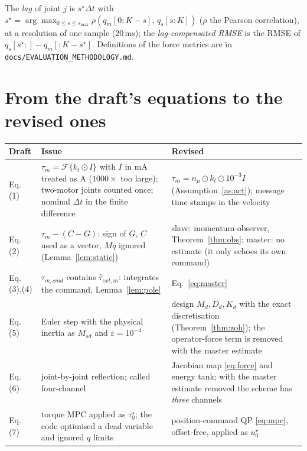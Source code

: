 \documentclass[11pt,a4paper]{article}
\theoremstyle{remark}
\theoremstyle{definition}
\begin{document}
The \emph{lag} of joint $j$ is $s^\star\Delta t$ with $s^\star=\arg\max_{0\le s\le s_{\max}}\rho(q_m[0{:}K{-}s],\,q_s[s{:}K])$ ($\rho$ the Pearson correlation), at a resolution of one sample (20\,ms); the \emph{lag-compensated RMSE} is the RMSE of $q_s[s^\star{:}]-q_m[{:}K{-}s^\star]$.
Definitions of the force metrics are in \texttt{docs/EVALUATION\_METHODOLOGY.md}.

\section{From the draft's equations to the revised ones}\label{sec:map-eq}
\begin{center}\small
\begin{tabular}{@{}p{1.6cm}p{5.2cm}p{7.2cm}@{}}
\toprule
Draft & Issue & Revised\\
\midrule
Eq.\,(1) & $\tau_m=\mathcal F\{k_t\odot I\}$ with $I$ in mA treated as A ($1000\times$ too large); two-motor joints counted once; nominal $\Delta t$ in the finite difference & $\tau_m=n_\mu\odot k_t\odot10^{-3}I$ (Assumption~\ref{as:act}); message time stamps in the velocity\\
Eq.\,(2) & $\tau_m-(C-G)$: sign of $G$, $C$ used as a vector, $M\ddot q$ ignored (Lemma~\ref{lem:static}) & slave: momentum observer, Theorem~\ref{thm:obs}; master: no estimate (it only echoes its own command)\\
Eq.\,(3),(4) & $\tau_{m,cmd}$ contains $\hat\tau_{ext,m}$: integrates the command, Lemma~\ref{lem:pole} & Eq.~\eqref{eq:master}\\
Eq.\,(5) & Euler step with the physical inertia as $M_{sd}$ and $\varepsilon=10^{-4}$ & design $M_d,D_d,K_d$ with the exact discretisation (Theorem~\ref{thm:zoh}); the operator-force term is removed with the master estimate\\
Eq.\,(6) & joint-by-joint reflection; called four-channel & Jacobian map \eqref{eq:force} and energy tank; with the master estimate removed the scheme has \emph{three} channels\\
Eq.\,(7) & torque MPC applied as $\tau_0^\star$; the code optimised a dead variable and ignored $q$ limits & position-command QP \eqref{eq:mpc}, offset-free, applied as $u_0^\star$\\
\bottomrule
\end{tabular}
\end{center}
\end{document}
